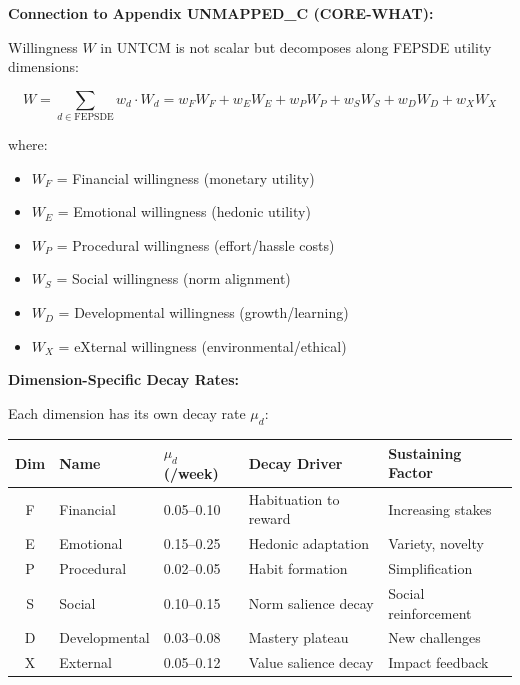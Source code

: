 \begin{tcolorbox}[colback=purple!5!white, colframe=purple!75!black,
    title=\textbf{Integration UNTCM-I3: FEPSDE Utility Decomposition}]

\textbf{Connection to Appendix UNMAPPED_C (CORE-WHAT):}

Willingness $W$ in UNTCM is not scalar but decomposes along FEPSDE utility dimensions:

\begin{equation}
\boxed{
W = \sum_{d \in \text{FEPSDE}} w_d \cdot W_d = w_F W_F + w_E W_E + w_P W_P + w_S W_S + w_D W_D + w_X W_X
}
\label{eq:W-fepsde}
\end{equation}

where:
\begin{itemize}[nosep]
\item $W_F$ = Financial willingness (monetary utility)
\item $W_E$ = Emotional willingness (hedonic utility)
\item $W_P$ = Procedural willingness (effort/hassle costs)
\item $W_S$ = Social willingness (norm alignment)
\item $W_D$ = Developmental willingness (growth/learning)
\item $W_X$ = eXternal willingness (environmental/ethical)
\end{itemize}

\textbf{Dimension-Specific Decay Rates:}

Each dimension has its own decay rate $\mu_d$:

\begin{center}
\renewcommand{\arraystretch}{1.2}
\begin{tabular}{@{}cllll@{}}
\toprule
\textbf{Dim} & \textbf{Name} & \textbf{$\mu_d$ (/week)} & \textbf{Decay Driver} & \textbf{Sustaining Factor} \\
\midrule
F & Financial & 0.05--0.10 & Habituation to reward & Increasing stakes \\
E & Emotional & 0.15--0.25 & Hedonic adaptation & Variety, novelty \\
P & Procedural & 0.02--0.05 & Habit formation & Simplification \\
S & Social & 0.10--0.15 & Norm salience decay & Social reinforcement \\
D & Developmental & 0.03--0.08 & Mastery plateau & New challenges \\
X & External & 0.05--0.12 & Value salience decay & Impact feedback \\
\bottomrule
\end{tabular}
\end{center}


\end{tcolorbox}
